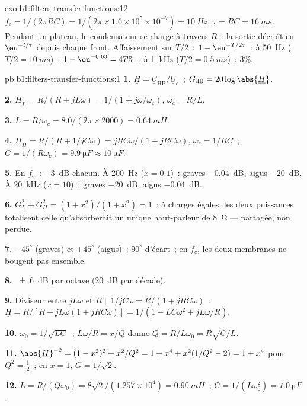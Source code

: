 \begin{solution}{exo:b1:filters-transfer-functions:12}
$f_c = 1/(2\pi RC) = 1/(2\pi \times 1.6\times10^5 \times 10^{-7}) =
\qty{10}{Hz}$, $\tau = RC = \qty{16}{ms}$. Pendant un plateau, le
condensateur se charge à travers $R$~: la sortie décroît en $\eu^{-t/\tau}$
depuis chaque front. Affaissement sur $T/2$~: $1 - \eu^{-T/2\tau}$~; à \qty{50}{Hz}
($T/2 = \qty{10}{ms}$)~: $1 - \eu^{-0.63} = 47\%$~; à \qty{1}{kHz}
($T/2 = \qty{0.5}{ms}$)~: $3\%$.
\end{solution}

\begin{solution}{pb:b1:filters-transfer-functions:1}
\textbf{1.} $\underline H = \underline U_{\text{HP}}/\underline U_e$~;
$G_{\mathrm{dB}} = 20\log\abs{\underline H}$.

\textbf{2.} $\underline H_L = R/(R + jL\omega) = 1/(1 + j\omega/\omega_c)$,
$\omega_c = R/L$.

\textbf{3.} $L = R/\omega_c = 8.0/(2\pi \times 2000) = \qty{0.64}{mH}$.

\textbf{4.} $\underline H_H = R/(R + 1/jC\omega) = jRC\omega/(1 + jRC\omega)$,
$\omega_c = 1/RC$~; $C = 1/(R\omega_c) = \qty{9.9}{\micro F} \approx
\qty{10}{\micro F}$.

\textbf{5.} En $f_c$~: \qty{-3}{dB} chacun. À \qty{200}{Hz} ($x = 0.1$)~:
graves \qty{-0.04}{dB}, aigus \qty{-20}{dB}. À \qty{20}{kHz} ($x = 10$)~:
graves \qty{-20}{dB}, aigus \qty{-0.04}{dB}.

\textbf{6.} $G_L^2 + G_H^2 = (1 + x^2)/(1 + x^2) = 1$~: à charges égales,
les deux puissances totalisent celle qu'absorberait un unique
haut-parleur de \qty{8}{\ohm} --- partagée, non perdue.

\textbf{7.} $-45^\circ$ (graves) et $+45^\circ$ (aigus)~: $90^\circ$
d'écart~; en $f_c$, les deux membranes ne bougent pas ensemble.

\textbf{8.} \qty{\pm 6}{dB} par octave (\qty{20}{dB} par décade).

\textbf{9.} Diviseur entre $jL\omega$ et $R \parallel 1/jC\omega =
R/(1 + jRC\omega)$~: $\underline H = R/[R + jL\omega(1 + jRC\omega)] =
1/(1 - LC\omega^2 + jL\omega/R)$.

\textbf{10.} $\omega_0 = 1/\sqrt{LC}$~; $L\omega/R = x/Q$ donne $Q =
R/L\omega_0 = R\sqrt{C/L}$.

\textbf{11.} $\abs{\underline H}^{-2} = (1 - x^2)^2 + x^2/Q^2 = 1 + x^4 +
x^2(1/Q^2 - 2) = 1 + x^4$ pour $Q^2 = \tfrac12$~; en $x = 1$, $G = 1/\sqrt2$.

\textbf{12.} $L = R/(Q\omega_0) = 8\sqrt2/(1.257\times10^4) = \qty{0.90}{mH}$~;
$C = 1/(L\omega_0^2) = \qty{7.0}{\micro F}$.


\end{solution}
